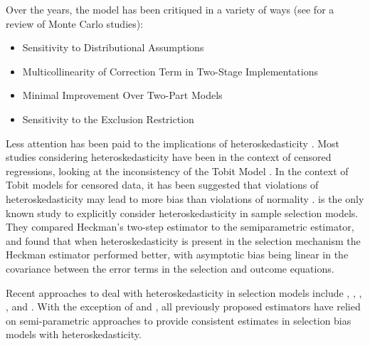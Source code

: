 \documentclass{article}
\begin{document}
Over the years, the \citet{heckman1979} model has been critiqued in a variety of ways (see \citet{puhani2000} for a review of Monte Carlo studies):

\begin{itemize}
    \item Sensitivity to Distributional Assumptions
    \item Multicollinearity of Correction Term in Two-Stage Implementations
    \item Minimal Improvement Over Two-Part Models
    \item Sensitivity to the Exclusion Restriction
\end{itemize}

Less attention has been paid to the implications of heteroskedasticity \citep{vella1998}.  Most studies considering heteroskedasticity have been in the context of censored regressions, looking at the inconsistency of the Tobit Model \citep{hurd1979, arabmazar1981, brown1983, brannas1989}.  In the context of Tobit models for censored data, it has been suggested that violations of heteroskedasticity may lead to more bias than violations of normality \citep{hurd1979}.  \citet{fernandez1999} is the only known study to explicitly consider heteroskedasticity in sample selection models. They compared Heckman's two-step estimator to the \citet{ahn1993} semiparametric estimator, and found that when heteroskedasticity is present in the selection mechanism the Heckman estimator performed better, with asymptotic bias being linear in the covariance between the error terms in the selection and outcome equations. 

Recent approaches to deal with heteroskedasticity in selection models include \citet{donald1995}, \citet{schaffner2002}, \citet{chen2003}, \citet{adkins2004}, and \citet{reichert2014}. With the exception of \citet{schaffner2002} and \citet{reichert2014}, all previously proposed estimators have relied on semi-parametric approaches to provide consistent estimates in selection bias models with heteroskedasticity.  
\end{document}
